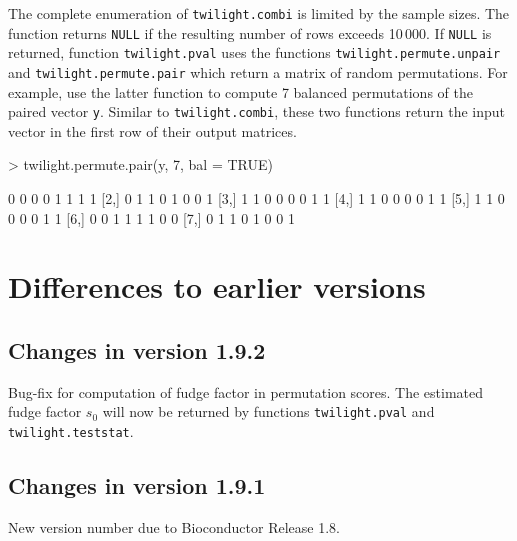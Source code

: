 \documentclass[11pt,a4paper,fleqn]{report}
\newcommand{\Rfunction}[1]{{\texttt{#1}}}
\newcommand{\Rfunarg}[1]{{\texttt{#1}}}
\begin{document}
The complete enumeration of \Rfunction{twilight.combi} is limited by the sample sizes. The function returns \Rfunarg{NULL} if the resulting number of rows exceeds 10\,000. If \Rfunarg{NULL} is returned, function \Rfunction{twilight.pval} uses the functions \Rfunction{twilight.permute.unpair} and \Rfunction{twilight.permute.pair} which return a matrix of random permutations. For example, use the latter function to compute 7 balanced permutations of the paired vector \Rfunarg{y}. Similar to \Rfunction{twilight.combi}, these two functions return the input vector in the first row of their output matrices.
\begin{Schunk}
\begin{Sinput}
> twilight.permute.pair(y, 7, bal = TRUE)
\end{Sinput}
\begin{Soutput}
     [,1] [,2] [,3] [,4] [,5] [,6] [,7] [,8]
[1,]    0    0    0    0    1    1    1    1
[2,]    0    1    1    0    1    0    0    1
[3,]    1    1    0    0    0    0    1    1
[4,]    1    1    0    0    0    0    1    1
[5,]    1    1    0    0    0    0    1    1
[6,]    0    0    1    1    1    1    0    0
[7,]    0    1    1    0    1    0    0    1
\end{Soutput}
\end{Schunk}




\chapter{Differences to earlier versions}


\section*{Changes in version 1.9.2}

Bug-fix for computation of fudge factor in permutation scores. The estimated fudge factor $s_0$ will now be returned by functions \Rfunction{twilight.pval} and \Rfunction{twilight.teststat}.


\section*{Changes in version 1.9.1}

New version number due to Bioconductor Release 1.8.
\end{document}
